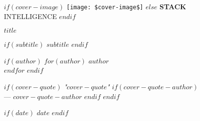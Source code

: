 \begin{titlepage}
\pagecolor{white}
\begin{center}

\vspace*{1cm}
$if(cover-image)$
\texttt{[image: \$cover-image\$]}
$else$
\textcolor{primaryblue}{\Huge\textbf{STACK}\\\Large INTELLIGENCE}
$endif$

\vspace{3cm}

{\fontsize{32pt}{38pt}\selectfont\textcolor{primaryblue}{\textbf{$title$}}}

\vspace{1cm}

$if(subtitle)$
{\fontsize{20pt}{24pt}\selectfont\textcolor{secondaryblue}{$subtitle$}}
\vspace{1cm}
$endif$

$if(author)$
\Large
$for(author)$
$author$\\
$endfor$
$endif$

\vspace{1cm}

$if(cover-quote)$
{\large\textcolor{primaryorange}{\textit{"$cover-quote$"}}}
$if(cover-quote-author)$
\\\vspace{0.3cm}
{\normalsize\textcolor{primaryorange}{— $cover-quote-author$}}
$endif$
$endif$

\vfill

$if(date)$
{\large\textcolor{secondarytext}{$date$}}
$endif$

\end{center}
\end{titlepage}
\pagecolor{white}